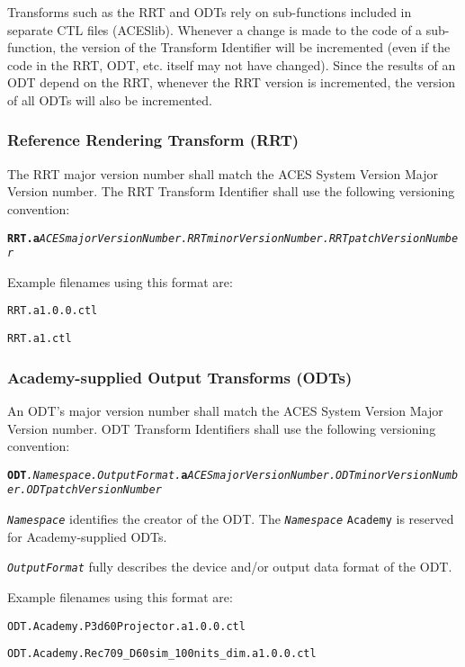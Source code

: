Transforms such as the RRT and ODTs rely on sub-functions included in separate CTL files (ACESlib). Whenever a change is made to the code of a sub-function, the version of the Transform Identifier will be incremented (even if the code in the RRT, ODT, etc. itself may not have changed). Since the results of an ODT depend on the RRT, whenever the RRT version is incremented, the version of all ODTs will also be incremented.

\subsubsection{Reference Rendering Transform (RRT)}
The RRT major version number shall match the ACES System Version Major Version number. The RRT Transform Identifier shall use the following versioning convention:

\texttt{\textbf{RRT.a}\textit{ACESmajorVersionNumber.RRTminorVersionNumber.RRTpatchVersionNumber}}

Example filenames using this format are: 
\begin{listize}
	\item \texttt{RRT.a1.0.0.ctl}
	\item \texttt{RRT.a1.ctl}
\end{listize}

\subsubsection{Academy-supplied Output Transforms (ODTs)}
An ODT's major version number shall match the ACES System Version Major Version number. ODT Transform Identifiers shall use the following versioning convention:

{\fontsize{7.5pt}{9pt}\selectfont
\texttt{\textbf{ODT}\textit{.Namespace.OutputFormat.\-}\textbf{a}\textit{ACESmajorVersionNumber.\-ODTminor\-Version\-Number.\-ODTpatchVersionNumber}} }

\texttt{\textit{Namespace}} identifies the creator of the ODT. The \texttt{\textit{Namespace}} \texttt{Academy} is reserved for Academy-supplied ODTs.

\texttt{\textit{OutputFormat}} fully describes the device and/or output data format of the ODT.

Example filenames using this format are:
\begin{listize}
	\item \texttt{ODT.Academy.P3d60Projector.a1.0.0.ctl}
	\item \texttt{ODT.Academy.Rec709\_D60sim\_100nits\_dim.a1.0.0.ctl}
\end{listize}

